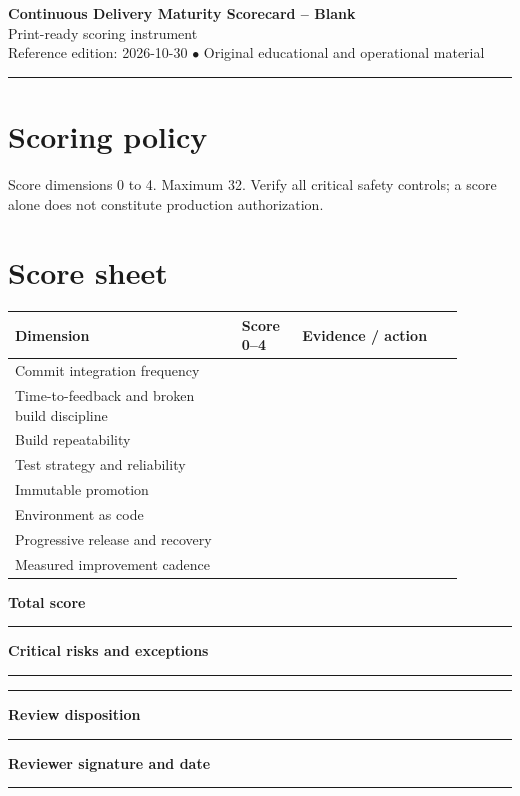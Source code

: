 \documentclass[10pt,letterpaper]{article}
\begin{document}
\begin{center}
{\LARGE\bfseries\color{cdblue}Continuous Delivery Maturity Scorecard -- Blank}\\[7pt]
{\large Print-ready scoring instrument}\\[6pt]
{\small Reference edition: 2026-10-30 $\bullet$ Original educational and operational material}
\end{center}
\noindent\color{cdblue}\rule{\linewidth}{1.2pt}\color{black}
\vspace{0.4em}
\section{Scoring policy}
Score dimensions 0 to 4. Maximum 32. Verify all critical safety controls; a score alone does not constitute production authorization.


\section{Score sheet}
\renewcommand{\arraystretch}{1.55}\begin{longtable}{|p{0.45\linewidth}|p{0.12\linewidth}|p{0.32\linewidth}|}\hline\textbf{Dimension} & \textbf{Score 0--4} & \textbf{Evidence / action}\\\hline
Commit integration frequency & & \rule{0pt}{32pt} \\\hline
Time-to-feedback and broken build discipline & & \rule{0pt}{32pt} \\\hline
Build repeatability & & \rule{0pt}{32pt} \\\hline
Test strategy and reliability & & \rule{0pt}{32pt} \\\hline
Immutable promotion & & \rule{0pt}{32pt} \\\hline
Environment as code & & \rule{0pt}{32pt} \\\hline
Progressive release and recovery & & \rule{0pt}{32pt} \\\hline
Measured improvement cadence & & \rule{0pt}{32pt} \\\hline
\end{longtable}

\textbf{Total score}\par
\noindent\rule{\linewidth}{0.35pt}\par\vspace{0.7em}
\textbf{Critical risks and exceptions}\par
\noindent\rule{\linewidth}{0.35pt}\par\vspace{0.7em}
\noindent\rule{\linewidth}{0.35pt}\par\vspace{0.7em}
\textbf{Review disposition}\par
\noindent\rule{\linewidth}{0.35pt}\par\vspace{0.7em}
\textbf{Reviewer signature and date}\par
\noindent\rule{\linewidth}{0.35pt}\par\vspace{0.7em}
\end{document}
